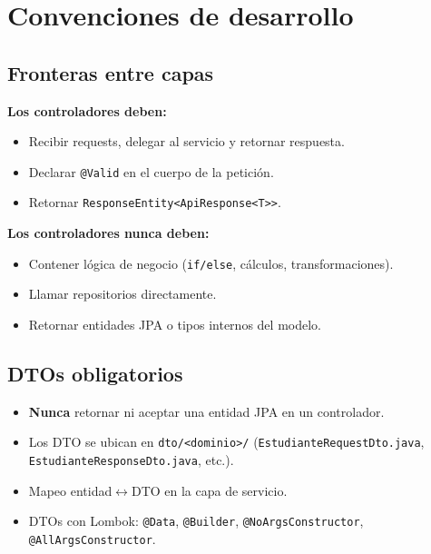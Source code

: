 \documentclass[11pt,a4paper,oneside]{article}
\newcommand{\code}[1]{\texttt{\small #1}}
\begin{document}
\section{Convenciones de desarrollo}

\subsection{Fronteras entre capas}

\textbf{Los controladores deben:}

\begin{itemize}[leftmargin=*]
  \item Recibir requests, delegar al servicio y retornar respuesta.
  \item Declarar \code{@Valid} en el cuerpo de la petición.
  \item Retornar \code{ResponseEntity<ApiResponse<T>>}.
\end{itemize}

\textbf{Los controladores nunca deben:}

\begin{itemize}[leftmargin=*]
  \item Contener lógica de negocio (\code{if/else}, cálculos, transformaciones).
  \item Llamar repositorios directamente.
  \item Retornar entidades JPA o tipos internos del modelo.
\end{itemize}

\subsection{DTOs obligatorios}

\begin{itemize}[leftmargin=*]
  \item \textbf{Nunca} retornar ni aceptar una entidad JPA en un controlador.
  \item Los DTO se ubican en \code{dto/<dominio>/} (\code{EstudianteRequestDto.java},
        \code{EstudianteResponseDto.java}, etc.).
  \item Mapeo entidad$\leftrightarrow$DTO en la capa de servicio.
  \item DTOs con Lombok: \code{@Data}, \code{@Builder}, \code{@NoArgsConstructor},
        \code{@AllArgsConstructor}.
\end{itemize}
\end{document}
